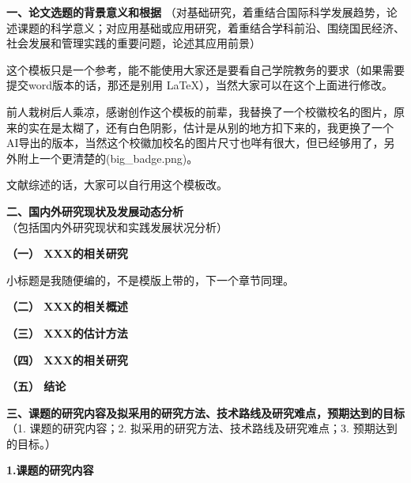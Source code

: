 \documentclass[11pt, a4paper]{article}
\begin{document}
\restoregeometry
\newpage
\setcounter{page}{1}

\fancypage{%
  \setlength{\fboxsep}{0.2cm}%
  \setlength{\fboxrule}{0.8pt}%
  \setlength{\shadowsize}{0cm}%
  \shadowbox}
{}

\vspace*{-0.6cm}
\noindent
{\fontsize{12pt}{\baselineskip}\selectfont \bfseries
  一、论文选题的背景意义和根据 
}
\newline
（对基础研究，着重结合国际科学发展趋势，论述课题的科学意义；对应用基础或应用研究，着重结合学科前沿、围绕国民经济、社会发展和管理实践的重要问题，论述其应用前景）

\vskip 0.2cm

这个模板只是一个参考，能不能使用大家还是要看自己学院教务的要求（如果需要提交word版本的话，那还是别用 \LaTeX ），当然大家可以在这个上面进行修改。

前人栽树后人乘凉，感谢创作这个模板的前辈，我替换了一个校徽校名的图片，原来的实在是太糊了，还有白色阴影，估计是从别的地方扣下来的，我更换了一个AI导出的版本，当然这个校徽加校名的图片尺寸也咩有很大，但已经够用了，另外附上一个更清楚的(big\_badge.png)。

文献综述的话，大家可以自行用这个模板改。

\newpage

\noindent
{\fontsize{12pt}{\baselineskip}\selectfont \bfseries
	二、国内外研究现状及发展动态分析 
}
\newline
（包括国内外研究现状和实践发展状况分析）

\noindent
{\bfseries
（一） XXX的相关研究
}

小标题是我随便编的，不是模版上带的，下一个章节同理。

\vskip 0.1cm
\noindent
{\bfseries
（二） XXX的相关概述
}

\vskip 0.1cm
\noindent
{\bfseries
（三） XXX的估计方法
}

\vskip 0.1cm
\noindent
{\bfseries
（四） XXX的相关研究
}

\vskip 0.1cm
\noindent
{\bfseries
（五） 结论
}


\newpage
\noindent
{\fontsize{12pt}{\baselineskip}\selectfont \bfseries
  三、课题的研究内容及拟采用的研究方法、技术路线及研究难点，预期达到的目标
}
\newline
（1. 课题的研究内容；2. 拟采用的研究方法、技术路线及研究难点；3. 预期达到的目标。）

\vskip 0.2cm

\vskip 0.1cm
\noindent
{\bfseries
  1.课题的研究内容
}
\end{document}
